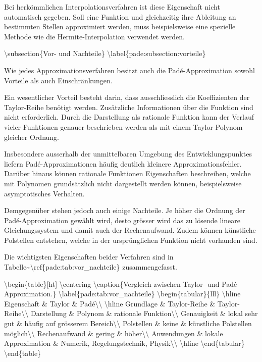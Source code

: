 Bei herkömmlichen Interpolationsverfahren ist diese Eigenschaft nicht
automatisch gegeben. Soll eine Funktion und gleichzeitig ihre Ableitung
an bestimmten Stellen approximiert werden, muss beispielsweise eine
spezielle Methode wie die Hermite-Interpolation verwendet werden.

\textbackslash subsection\{Vor- und Nachteile\}
\textbackslash label\{pade:subsection:vorteile\}

Wie jedes Approximationsverfahren besitzt auch die Padé-Approximation
sowohl Vorteile als auch Einschränkungen.

Ein wesentlicher Vorteil besteht darin, dass ausschliesslich die
Koeffizienten der Taylor-Reihe benötigt werden. Zusätzliche
Informationen über die Funktion sind nicht erforderlich. Durch die
Darstellung als rationale Funktion kann der Verlauf vieler Funktionen
genauer beschrieben werden als mit einem Taylor-Polynom gleicher
Ordnung.

Insbesondere ausserhalb der unmittelbaren Umgebung des
Entwicklungspunktes liefern Padé-Approximationen häufig deutlich
kleinere Approximationsfehler. Darüber hinaus können rationale
Funktionen Eigenschaften beschreiben, welche mit Polynomen grundsätzlich
nicht dargestellt werden können, beispielsweise asymptotisches
Verhalten.

Demgegenüber stehen jedoch auch einige Nachteile. Je höher die Ordnung
der Padé-Approximation gewählt wird, desto grösser wird das zu lösende
lineare Gleichungssystem und damit auch der Rechenaufwand. Zudem können
künstliche Polstellen entstehen, welche in der ursprünglichen Funktion
nicht vorhanden sind.

Die wichtigsten Eigenschaften beider Verfahren sind in
Tabelle\textasciitilde\textbackslash ref\{pade:tab:vor\_nachteile\}
zusammengefasst.

\textbackslash begin\{table\}{[}ht{]} \textbackslash centering
\textbackslash caption\{Vergleich zwischen Taylor- und
Padé-Approximation.\} \textbackslash label\{pade:tab:vor\_nachteile\}
\textbackslash begin\{tabular\}\{lll\} \textbackslash hline Eigenschaft
\& Taylor \& Padé\textbackslash\textbackslash{} \textbackslash hline
Grundlage \& Taylor-Reihe \& Taylor-Reihe\textbackslash\textbackslash{}
Darstellung \& Polynom \& rationale
Funktion\textbackslash\textbackslash{} Genauigkeit \& lokal sehr gut \&
häufig auf grösserem Bereich\textbackslash\textbackslash{} Polstellen \&
keine \& künstliche Polstellen möglich\textbackslash\textbackslash{}
Rechenaufwand \& gering \& höher\textbackslash\textbackslash{}
Anwendungen \& lokale Approximation \& Numerik, Regelungstechnik,
Physik\textbackslash\textbackslash{} \textbackslash hline
\textbackslash end\{tabular\} \textbackslash end\{table\}
